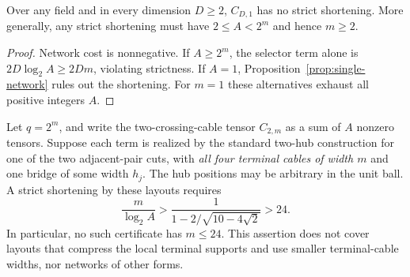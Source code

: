 \begin{proposition}
\label{prop:width-one}
Over any field and in every dimension $D\ge2$, $C_{D,1}$ has no strict
shortening.  More generally, any strict shortening must have
$2\le A<2^m$ and hence $m\ge2$.
\end{proposition}
\begin{proof}
Network cost is nonnegative.  If $A\ge2^m$, the selector term alone
is $2D\log_2 A\ge2Dm$, violating strictness.  If $A=1$,
Proposition~\ref{prop:single-network} rules out the shortening.
For $m=1$ these alternatives exhaust all positive integers $A$.
\end{proof}

\begin{proposition}
\label{prop:full-width-obstruction}
Let $q=2^m$, and write the two-crossing-cable tensor $C_{2,m}$ as a sum
of $A$ nonzero tensors.  Suppose each term is realized by the standard
two-hub construction for one of the two adjacent-pair cuts, with
\emph{all four terminal cables of width $m$} and one bridge of some
width $h_j$.  The hub positions may be arbitrary in the unit ball.
A strict shortening by these layouts requires
\[
 \frac{m}{\log_2 A}
 >\frac{1}{1-2/\sqrt{10-4\sqrt2}}>24.
\]
In particular, no such certificate has $m\le24$.  This assertion does
not cover layouts that compress the local terminal supports and use
smaller terminal-cable widths, nor networks of other forms.
\end{proposition}

